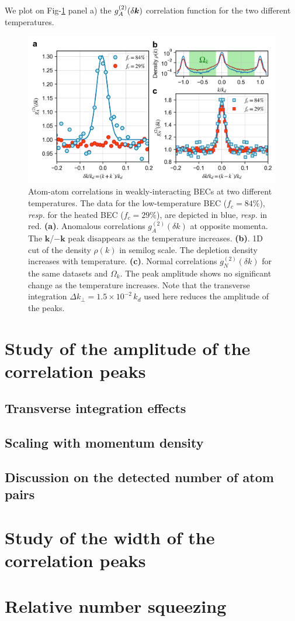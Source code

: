 We plot on Fig-\ref{fig:kmk_temperature} panel a) the $g^{(2)}_A (\delta \bm{k})$ correlation function for the two different temperatures. 

\begin{figure}
    \centering
    \includegraphics{Fig/Chapter4/kmk_temperature.png}
    \caption{Atom-atom correlations in weakly-interacting BECs at two different temperatures. The data for the low-temperature BEC ($f_{c}=84\%$), {\it resp.} for the heated BEC ($f_{c}=29\%$), are depicted in blue, {\it resp.} in red. 
    {\bf (a)}. Anomalous correlations $g_{A}^{(2)}(\delta k)$ at opposite momenta. The ${\bm k}$/$-{\bm k}$ peak disappears as the temperature increases.
    {\bf (b)}. 1D cut of the density $\rho(k)$ in semilog scale. The depletion density increases with temperature.
    {\bf (c)}. Normal correlations $g_{N}^{(2)}(\delta k)$ for the same datasets and $\Omega_k$. The peak amplitude shows no significant change as the temperature increases. Note that the transverse integration $\Delta k_{\perp}=1.5 \times 10^{-2} \, k_d$ used here reduces the amplitude of the peaks.}
    \label{fig:kmk_temperature}
\end{figure}

\section{Study of the amplitude of the correlation peaks}

\subsection{Transverse integration effects}

\subsection{Scaling with momentum density}

\subsection{Discussion on the detected number of atom pairs}

\section{Study of the width of the correlation peaks}

\section{Relative number squeezing}